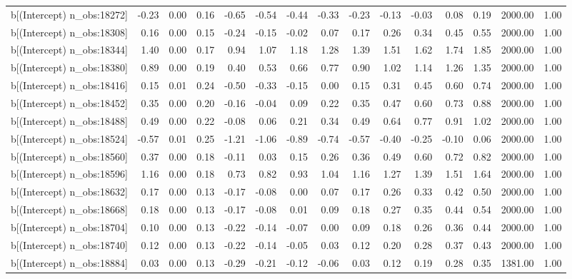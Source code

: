 \begin{table}[ht]
\begin{tabular}{rrrrrrrrrrrrrrr}
  b[(Intercept) n\_obs:18272] & -0.23 & 0.00 & 0.16 & -0.65 & -0.54 & -0.44 & -0.33 & -0.23 & -0.13 & -0.03 & 0.08 & 0.19 & 2000.00 & 1.00 \\ 
  b[(Intercept) n\_obs:18308] & 0.16 & 0.00 & 0.15 & -0.24 & -0.15 & -0.02 & 0.07 & 0.17 & 0.26 & 0.34 & 0.45 & 0.55 & 2000.00 & 1.00 \\ 
  b[(Intercept) n\_obs:18344] & 1.40 & 0.00 & 0.17 & 0.94 & 1.07 & 1.18 & 1.28 & 1.39 & 1.51 & 1.62 & 1.74 & 1.85 & 2000.00 & 1.00 \\ 
  b[(Intercept) n\_obs:18380] & 0.89 & 0.00 & 0.19 & 0.40 & 0.53 & 0.66 & 0.77 & 0.90 & 1.02 & 1.14 & 1.26 & 1.35 & 2000.00 & 1.00 \\ 
  b[(Intercept) n\_obs:18416] & 0.15 & 0.01 & 0.24 & -0.50 & -0.33 & -0.15 & 0.00 & 0.15 & 0.31 & 0.45 & 0.60 & 0.74 & 2000.00 & 1.00 \\ 
  b[(Intercept) n\_obs:18452] & 0.35 & 0.00 & 0.20 & -0.16 & -0.04 & 0.09 & 0.22 & 0.35 & 0.47 & 0.60 & 0.73 & 0.88 & 2000.00 & 1.00 \\ 
  b[(Intercept) n\_obs:18488] & 0.49 & 0.00 & 0.22 & -0.08 & 0.06 & 0.21 & 0.34 & 0.49 & 0.64 & 0.77 & 0.91 & 1.02 & 2000.00 & 1.00 \\ 
  b[(Intercept) n\_obs:18524] & -0.57 & 0.01 & 0.25 & -1.21 & -1.06 & -0.89 & -0.74 & -0.57 & -0.40 & -0.25 & -0.10 & 0.06 & 2000.00 & 1.00 \\ 
  b[(Intercept) n\_obs:18560] & 0.37 & 0.00 & 0.18 & -0.11 & 0.03 & 0.15 & 0.26 & 0.36 & 0.49 & 0.60 & 0.72 & 0.82 & 2000.00 & 1.00 \\ 
  b[(Intercept) n\_obs:18596] & 1.16 & 0.00 & 0.18 & 0.73 & 0.82 & 0.93 & 1.04 & 1.16 & 1.27 & 1.39 & 1.51 & 1.64 & 2000.00 & 1.00 \\ 
  b[(Intercept) n\_obs:18632] & 0.17 & 0.00 & 0.13 & -0.17 & -0.08 & 0.00 & 0.07 & 0.17 & 0.26 & 0.33 & 0.42 & 0.50 & 2000.00 & 1.00 \\ 
  b[(Intercept) n\_obs:18668] & 0.18 & 0.00 & 0.13 & -0.17 & -0.08 & 0.01 & 0.09 & 0.18 & 0.27 & 0.35 & 0.44 & 0.54 & 2000.00 & 1.00 \\ 
  b[(Intercept) n\_obs:18704] & 0.10 & 0.00 & 0.13 & -0.22 & -0.14 & -0.07 & 0.00 & 0.09 & 0.18 & 0.26 & 0.36 & 0.44 & 2000.00 & 1.00 \\ 
  b[(Intercept) n\_obs:18740] & 0.12 & 0.00 & 0.13 & -0.22 & -0.14 & -0.05 & 0.03 & 0.12 & 0.20 & 0.28 & 0.37 & 0.43 & 2000.00 & 1.00 \\ 
  b[(Intercept) n\_obs:18884] & 0.03 & 0.00 & 0.13 & -0.29 & -0.21 & -0.12 & -0.06 & 0.03 & 0.12 & 0.19 & 0.28 & 0.35 & 1381.00 & 1.00 \\ 

\end{tabular}
\end{table}
